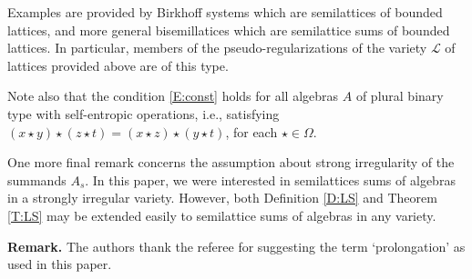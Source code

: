 \documentclass{birkau}
\def\Om{\Omega}
\newcommand{\mc}{\mathcal}
\theoremstyle{plain}
\theoremstyle{definition}
\numberwithin{equation}{section}
\begin{document}
Examples are provided by Birkhoff systems which are semilattices of bounded lattices, and
more general bisemillatices which are semilattice sums of bounded lattices. In particular,
members of the pseudo-regularizations of the variety $\mc{L}$ of lattices provided above
are of this type.

Note also that the condition \eqref{E:const} holds for all algebras $A$ of plural binary
type with self-entropic operations, i.e.,  satisfying $(x \star y) \star (z \star t)
=  (x \star z) \star (y \star t)$, for each $\star \in \Om$.

One more final remark concerns the assumption about strong irregularity of the summands
$A_s$. In this paper, we were interested in semilattices sums of algebras in a strongly
irregular variety. However, both Definition \ref{D:LS} and Theorem \ref{T:LS} may be
extended easily to semilattice sums of algebras in any variety.

\bigskip
\noindent\textbf{Remark.} The authors thank the referee for suggesting the term
`prolongation' as used in this paper. 
\end{document}
